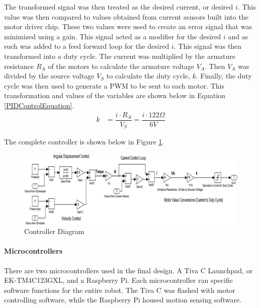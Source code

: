 \documentclass[11pt]{report}
\begin{document}
\begin{spacing}{1.5}
        The transformed signal was then treated as the desired current, or desired $i$.  This value was then compared to values obtained from current sensors built into the motor driver chip.  These two values were used to create an error signal that was minimized using a gain.  This signal acted as a modifier for the desired $i$ and as such was added to a feed forward loop for the desired $i$.  This signal was then transformed into a duty cycle.  The current was multiplied by the armature resistance $R_A$ of the motors to calculate the armature voltage $V_A$.  Then $V_A$ was divided by the source voltage $V_S$ to calculate the duty cycle, $k$.  Finally, the duty cycle was then used to generate a PWM to be sent to each motor.  This transformation and values of the variables are shown below in Equation \ref{PIDControlEquation}.
        \begin{align}
    k &= \dfrac{i \cdot  R_A}{V_S} = \dfrac{i \cdot 122 \Omega}{6 V} \label{PIDControlEquation}
\end{align}

The complete controller is shown below in Figure \ref{ControllerDiagram}.

\begin{figure}[H]
                \centering
                \includegraphics[width=\textwidth]{ControllerDiagram}
                \caption{Controller Diagram}
                \label{ControllerDiagram}
            \end{figure}
        
        \paragraph{Microcontrollers}
        
        There are two microcontrollers used in the final design.  A Tiva C Launchpad, or EK-TM4C123GXL, and a Raspberry Pi.  Each microcontroller ran specific software functions for the entire robot.  The Tiva C was flashed with motor controlling software, while the Raspberry Pi housed motion sensing software.


\end{spacing}
\end{document}

